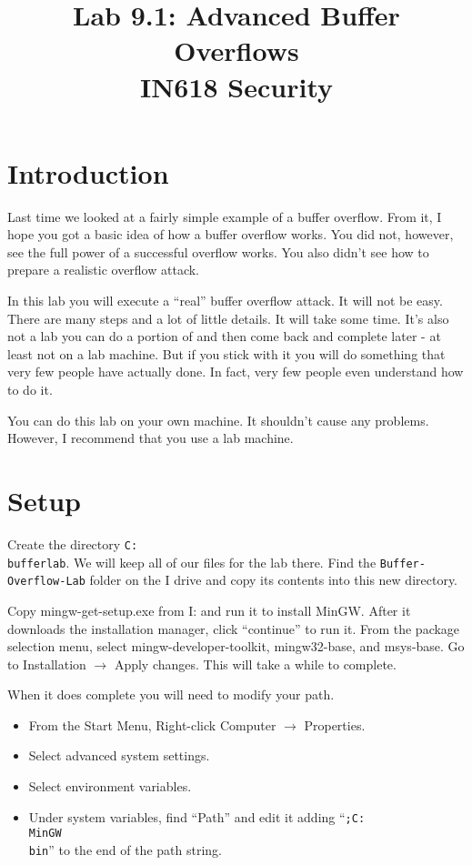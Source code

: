 \documentclass{article}
\begin{document}
\title{ Lab 9.1: Advanced Buffer Overflows\\ IN618 Security}
\maketitle

\section*{Introduction}
Last time we looked at a fairly simple example of a buffer overflow.  From it, I hope
you got a basic idea of how a buffer overflow works. You did not, however, see the full
power of a successful overflow works.  You also didn't see how to prepare a realistic 
overflow attack.

In this lab you will execute a ``real'' buffer overflow attack.  It will not be easy.
There are many steps and a lot of little details.  It will take some time.  It's also not
a lab you can do a portion of and then come back and complete later - at least not on a lab
machine.  But if you stick with it you will do something that very few people have actually done.
In fact, very few people even understand how to do it.

You can do this lab on your own machine.  It shouldn't cause any problems.  However, I recommend that 
you use a lab machine.

\section{Setup}
Create the directory \texttt{C:\\bufferlab}.  We will keep all of our files for the lab there.  
Find the \texttt{Buffer-Overflow-Lab} folder on the I drive and copy its contents into this new 
directory. 

Copy mingw-get-setup.exe from I: and run it to install MinGW. After it downloads the installation manager, click ``continue'' to run it.  From the package selection menu, select mingw-developer-toolkit, mingw32-base, and  msys-base.  Go to Installation $\rightarrow$ Apply changes.  This will take a while to complete.

When it does complete you will need to modify your path.
\begin{itemize}
	\item From the Start Menu, Right-click Computer $\rightarrow$ Properties.
	\item Select advanced system settings.
	\item Select environment variables.
	\item Under system variables, find ``Path'' and edit it adding
		``\texttt{;C:\\MinGW\\bin}'' to the end of the path string.
\end{itemize}
\end{document}
